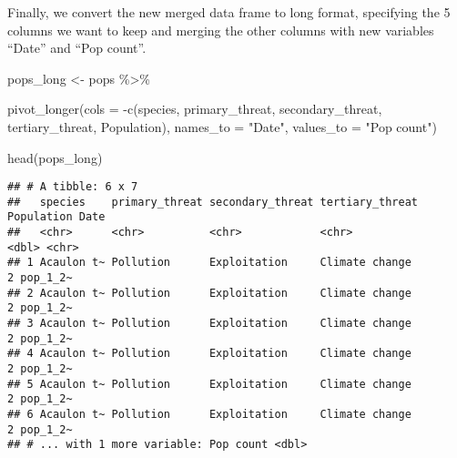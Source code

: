 \documentclass[
]{article}
\newenvironment{Shaded}{\begin{snugshade}}{\end{snugshade}}
\newcommand{\AttributeTok}[1]{\textcolor[rgb]{0.77,0.63,0.00}{#1}}
\newcommand{\FunctionTok}[1]{\textcolor[rgb]{0.00,0.00,0.00}{#1}}
\newcommand{\NormalTok}[1]{#1}
\newcommand{\OtherTok}[1]{\textcolor[rgb]{0.56,0.35,0.01}{#1}}
\newcommand{\SpecialCharTok}[1]{\textcolor[rgb]{0.00,0.00,0.00}{#1}}
\newcommand{\StringTok}[1]{\textcolor[rgb]{0.31,0.60,0.02}{#1}}
\begin{document}
Finally, we convert the new merged data frame to long format, specifying
the 5 columns we want to keep and merging the other columns with new
variables ``Date'' and ``Pop count''.

\begin{Shaded}
\begin{Highlighting}[]
\NormalTok{pops\_long }\OtherTok{\textless{}{-}}\NormalTok{ pops }\SpecialCharTok{\%\textgreater{}\%}
  
  \FunctionTok{pivot\_longer}\NormalTok{(}\AttributeTok{cols =} \SpecialCharTok{{-}}\FunctionTok{c}\NormalTok{(species,}
\NormalTok{                         primary\_threat,}
\NormalTok{                         secondary\_threat,}
\NormalTok{                         tertiary\_threat,}
\NormalTok{                         Population),}
               \AttributeTok{names\_to =} \StringTok{"Date"}\NormalTok{,}
               \AttributeTok{values\_to =} \StringTok{"Pop count"}\NormalTok{)}

\FunctionTok{head}\NormalTok{(pops\_long)}
\end{Highlighting}
\end{Shaded}

\begin{verbatim}
## # A tibble: 6 x 7
##   species    primary_threat secondary_threat tertiary_threat Population Date    
##   <chr>      <chr>          <chr>            <chr>                <dbl> <chr>   
## 1 Acaulon t~ Pollution      Exploitation     Climate change           2 pop_1_2~
## 2 Acaulon t~ Pollution      Exploitation     Climate change           2 pop_1_2~
## 3 Acaulon t~ Pollution      Exploitation     Climate change           2 pop_1_2~
## 4 Acaulon t~ Pollution      Exploitation     Climate change           2 pop_1_2~
## 5 Acaulon t~ Pollution      Exploitation     Climate change           2 pop_1_2~
## 6 Acaulon t~ Pollution      Exploitation     Climate change           2 pop_1_2~
## # ... with 1 more variable: Pop count <dbl>
\end{verbatim}
\end{document}
